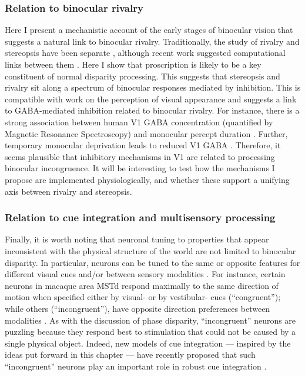 \subsubsection*{Relation to binocular rivalry}

Here I present a mechanistic account of the early stages of binocular vision that suggests a natural link to binocular rivalry. Traditionally, the study of rivalry and stereopsis have been separate \cite{Blake:2011bb, Blake:2012wr}, although recent work suggested computational links between them \cite{Muryy:2014hk}. Here I show that proscription is likely to be a key constituent of normal disparity processing. This suggests that stereopsis and rivalry sit along a spectrum of binocular responses mediated by inhibition. This is compatible with work on the perception of visual appearance \cite{Muryy:2016km} and suggests a link to GABA-mediated inhibition related to binocular rivalry. For instance, there is a strong association between human V1 GABA concentration (quantified by Magnetic Resonance Spectroscopy) and monocular percept duration \cite{vanLoon:2013da}. Further, temporary monocular deprivation leads to reduced V1 GABA \cite{Lunghi:2015fc}. Therefore, it seems plausible that inhibitory mechanisms in V1 are related to processing binocular incongruence. It will be interesting to test how the mechanisms I propose are implemented physiologically, and whether these support a unifying axis between rivalry and stereopsis.

\subsubsection*{Relation to cue integration and multisensory processing}


Finally, it is worth noting that neuronal tuning to properties that appear inconsistent with the physical structure of the world are not limited to binocular disparity. In particular, neurons can be tuned to the same or opposite features for different visual cues and/or between sensory modalities \cite{Nadler:2008ha, Kim:2014ic, Morgan:2008fh}. For instance, certain neurons in macaque area MSTd respond maximally to the same direction of motion when specified either by visual- or by vestibular- cues (``congruent''); while others (``incongruent''), have opposite direction preferences between modalities \cite{Morgan:2008fh}. As with the discussion of phase disparity, ``incongruent'' neurons are puzzling because they respond best to stimulation that could not be caused by a single physical object. Indeed, new models of cue integration --- inspired by the ideas put forward in this chapter --- have recently proposed that such ``incongruent'' neurons play an important role in robust cue integration \cite{Rideaux:2018aa}.

